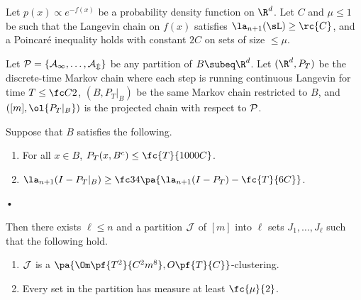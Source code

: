 \begin{lem}\label{lem:any-partition}
Let $p(x)\propto e^{-f(x)}$ be a probability density function on $\R^d$. 
Let $C$ and $\mu\le 1$ be such that the Langevin chain on $f(x)$ satisfies $\la_{n+1}(\sL)\ge \rc{C}$, and a Poincar\'e inequality holds with constant $2C$ on sets of size $\le \mu$.

Let $\cal P=\{A_1,\ldots, A_m\}$ be any partition of $B\subeq \R^d$.
Let $( \R^d, P_T)$ be the discrete-time Markov chain where each step is running continuous Langevin for time $T\le \fc C2$, $(B, P_T|_B)$ be the same Markov chain restricted to $B$, and $([m], \ol{P_T|_B})$ is the projected chain with respect to $\cal P$. 

Suppose that $B$ satisfies the following.
\begin{enumerate}
\item
For all $x\in B$, $P_T(x,B^c) \le \fc{T}{1000C}$. 
\item
$\la_{n+1}(I-P_T|_B) \ge \fc 34\pa{\la_{n+1}(I-P_T) - \fc{T}{6C}}$.
\end{enumerate}•

Then there exists $\ell \le n$ and a partition $\cal J$ of $[m]$ into $\ell$ sets  $J_1,\ldots, J_\ell$ such that the following hold.
\begin{enumerate}
\item
$\cal J$ is a $\pa{\Om\pf{T^2}{C^2m^8}, O\pf{T}{C}}$-clustering.
\item
Every set in the partition has measure at least $\fc{\mu}{2}$.
\end{enumerate}
\end{lem}

